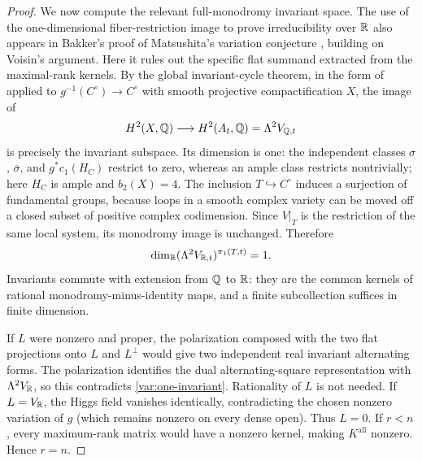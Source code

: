 \begin{proof}
We now compute the relevant full-monodromy invariant space.
The use of the one-dimensional fiber-restriction image to prove
irreducibility over $\mathbb R$ also appears in Bakker's proof of Matsushita's
variation conjecture \cite[Lemma~5]{Bakker2025}, building on Voisin's
argument. Here it rules out the specific flat summand extracted from
the maximal-rank kernels.  By the
global invariant-cycle theorem, in the form of
\cite[Theorem~4.1.1(ii)]{Deligne1971} applied to
$g^{-1}(C^\circ)\to C^\circ$ with smooth projective compactification
$X$, the image of
\[
       H^2(X,\mathbb Q)\longrightarrow H^2(A_t,\mathbb Q)=\Lambda^2 V_{\mathbb Q,t}
\]
is precisely the invariant subspace.  Its dimension is one: the
independent classes $\sigma$, $\overline\sigma$, and $g^*c_1(H_C)$
restrict to zero, whereas an ample class restricts nontrivially;
here $H_C$ is ample and $b_2(X)=4$.
The inclusion $T\hookrightarrow C^\circ$ induces a surjection of
fundamental groups, because loops in a smooth complex variety can
be moved off a closed subset of positive complex codimension.
Since $V|_T$ is the restriction of the same local system, its
monodromy image is unchanged.  Therefore
\begin{equation}
            \dim_\mathbb R(\Lambda^2 V_{\mathbb R,t})^{\pi_1(T,t)}=1.
 \label{var:one-invariant}
\end{equation}
Invariants commute with extension from $\mathbb Q$ to $\mathbb R$: they are the
common kernels of rational monodromy-minus-identity maps, and a
finite subcollection suffices in finite dimension.

If $L$ were nonzero and proper, the polarization composed with the
two flat projections onto $L$ and $L^\perp$ would give two independent
real invariant alternating forms.  The polarization identifies the
dual alternating-square representation with $\Lambda^2 V_\mathbb R$, so
this contradicts \eqref{var:one-invariant}.  Rationality of $L$ is
not needed.  If $L=V_\mathbb R$, the Higgs field vanishes identically,
contradicting the chosen nonzero variation of $g$ (which remains
nonzero on every dense open).  Thus $L=0$.  If $r<n$, every
maximum-rank matrix would have a nonzero kernel, making
$K^{\mathrm{all}}$ nonzero.  Hence $r=n$.
\end{proof}


